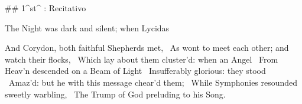 ## 1^st^ \mvmt: Recitativo

\beginnumbering
\pstart
The Night was dark and silent; when Lycidas 

And Corydon, both faithful Shepherds met, \
As wont to meet each other; and watch their flocks, \
Which lay about them cluster’d: when an Angel \
From Heav’n descended on a Beam of Light \
Insufferably glorious: they stood \
Amaz’d: but he with this message chear’d them; \
While Symphonies resounded sweetly warbling, \
The Trump of God preluding to his Song.
\pend
\endnumbering
